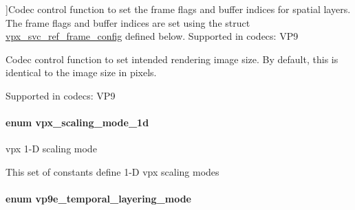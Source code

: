 \begin{Desc}
\begin{description}
{}]Codec control function to set the frame flags and buffer indices for spatial layers. The frame flags and buffer indices are set using the struct \hyperlink{structvpx__svc__ref__frame__config}{vpx\+\_\+svc\+\_\+ref\+\_\+frame\+\_\+config} defined below. Supported in codecs\+: V\+P9 \item[{\em 
V\+P9\+E\+\_\+\+S\+E\+T\+\_\+\+R\+E\+N\+D\+E\+R\+\_\+\+S\+I\+ZE\hypertarget{group__vp8__encoder_gga6deae3d561c838952552c3d3756322ecacabcfc4edba61f54d6a7b7592a64e48b}{}\label{group__vp8__encoder_gga6deae3d561c838952552c3d3756322ecacabcfc4edba61f54d6a7b7592a64e48b}
}]Codec control function to set intended rendering image size. By default, this is identical to the image size in pixels.

Supported in codecs\+: V\+P9 \end{description}
\end{Desc}
\paragraph[{\texorpdfstring{vpx\+\_\+scaling\+\_\+mode\+\_\+1d}{vpx_scaling_mode_1d}}]{\setlength{\rightskip}{0pt plus 5cm}enum {\bf vpx\+\_\+scaling\+\_\+mode\+\_\+1d}}\hypertarget{group__vp8__encoder_ga70071b1bb6cac9a1ef0ea3d8362ff94f}{}\label{group__vp8__encoder_ga70071b1bb6cac9a1ef0ea3d8362ff94f}


vpx 1-\/D scaling mode 

This set of constants define 1-\/D vpx scaling modes 
\paragraph[{\texorpdfstring{vp9e\+\_\+temporal\+\_\+layering\+\_\+mode}{vp9e_temporal_layering_mode}}]{\setlength{\rightskip}{0pt plus 5cm}enum {\bf vp9e\+\_\+temporal\+\_\+layering\+\_\+mode}}\hypertarget{group__vp8__encoder_gabe875c0c3993e488ffb342cf548a8ce8}{}\label{group__vp8__encoder_gabe875c0c3993e488ffb342cf548a8ce8}


